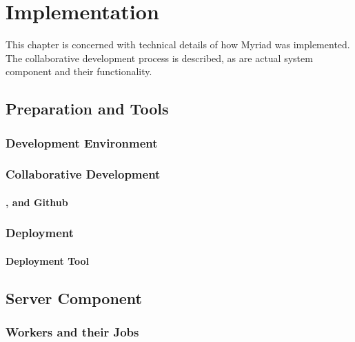 \chapter{Implementation}
\label{chapter:Implementation}

This chapter is concerned with technical details of how Myriad was implemented. The collaborative development process is described, as are actual system component and their functionality.

\section{Preparation and Tools}

\lipsum[1]

\subsection{Development Environment}

\lipsum[1]

\subsection{Collaborative Development}

\lipsum[1]

\subsubsection{,  and Github}

\lipsum[1]

\subsection{Deployment}

\lipsum[1]

\subsubsection{Deployment Tool }

\lipsum[1]


\section{Server Component}

\lipsum[1]

\subsection{Workers and their Jobs}


